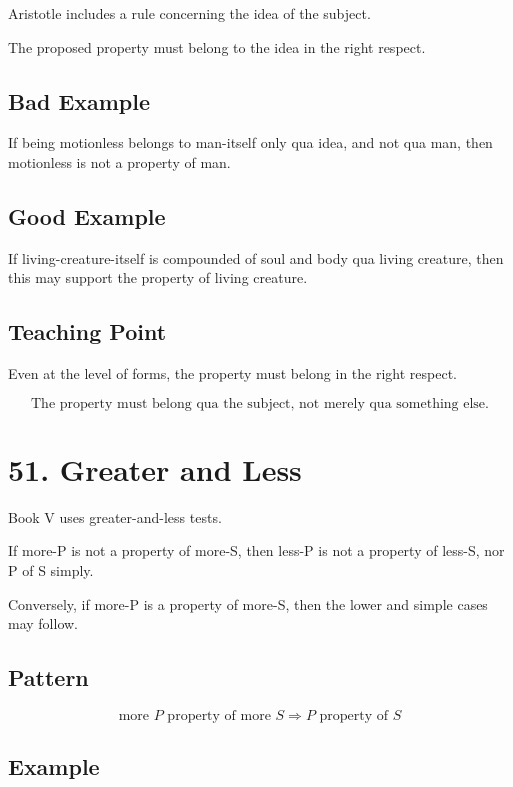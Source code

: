 \documentclass[12pt]{article}
\begin{document}
Aristotle includes a rule concerning the idea of the subject.

The proposed property must belong to the idea in the right respect.

\subsection*{Bad Example}

If being motionless belongs to man-itself only qua idea, and not qua man, then
motionless is not a property of man.

\subsection*{Good Example}

If living-creature-itself is compounded of soul and body qua living creature,
then this may support the property of living creature.

\subsection*{Teaching Point}

Even at the level of forms, the property must belong in the right respect.

\[
\boxed{
\text{The property must belong qua the subject, not merely qua something else.}
}
\]

\section*{51. Greater and Less}

Book V uses greater-and-less tests.

If more-P is not a property of more-S, then less-P is not a property of less-S,
nor P of S simply.

Conversely, if more-P is a property of more-S, then the lower and simple cases
may follow.

\subsection*{Pattern}

\[
\text{more } P \text{ property of more } S
\Rightarrow
P \text{ property of } S
\]

\subsection*{Example}
\end{document}
